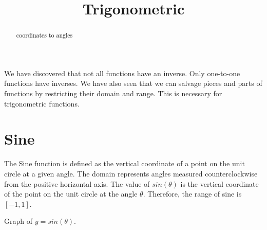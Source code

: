 \documentclass{ximera}
\title{Trigonometric}
\begin{document}
\begin{abstract}
coordinates to angles
\end{abstract}
\maketitle



We have discovered that not all functions have an inverse.  Only one-to-one functions have inverses.  We have also seen that we can salvage pieces and parts of functions by restricting their domain and range.  This is necessary for trigonometric functions.





\section*{Sine}

The Sine function is defined as the vertical coordinate of a point on the unit circle at a given angle.  The domain represents angles measured counterclockwise from the positive horizontal axis. The value of $sin(\theta)$ is the vertical coordinate of the point on the unit circle at the angle $\theta$. Therefore, the range of sine is $[-1, 1]$.


Graph of $y = sin(\theta)$.

\begin{image}
\end{image}
\end{document}
